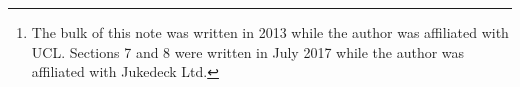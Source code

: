 \documentclass[a4paper,10pt]{article}
\date{14th July, 2017\footnote{The bulk of this note was written in 2013 while the author
was affiliated with UCL. Sections 7 and 8 were written in July 2017 while the author was affiliated with Jukedeck Ltd.}}
\title{\TheTitle}
\author{\TheAuthors}
\begin{document}
	\maketitle
	\begin{abstract}\TheAbstract\end{abstract}
	

	
	{}
\end{document}
